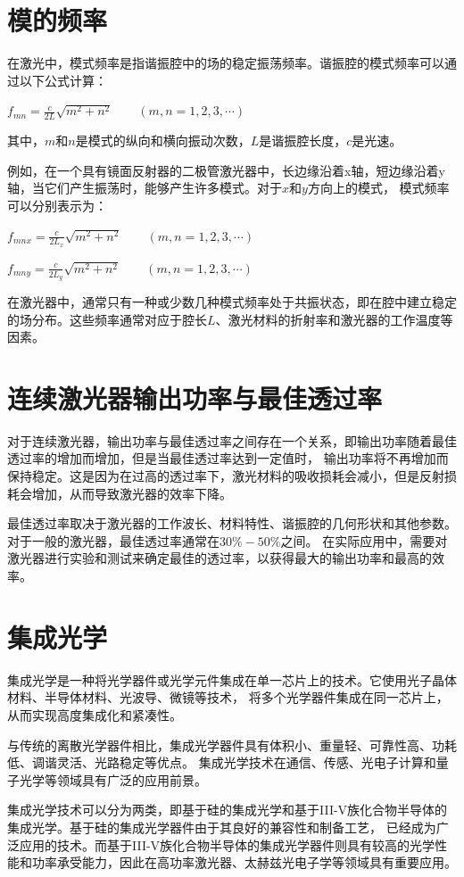 \documentclass[12pt, a4paper, oneside]{article}
\begin{document}
\begin{spacing}{2.0}
\section{模的频率}
在激光中，模式频率是指谐振腔中的场的稳定振荡频率。谐振腔的模式频率可以通过以下公式计算：

$f_{mn}=\frac{c}{2L}\sqrt{m^2+n^2}\qquad(m,n=1,2,3,\cdots)$

其中，$m$和$n$是模式的纵向和横向振动次数，$L$是谐振腔长度，$c$是光速。

例如，在一个具有镜面反射器的二极管激光器中，长边缘沿着x轴，短边缘沿着y轴，当它们产生振荡时，能够产生许多模式。对于$x$和$y$方向上的模式，
模式频率可以分别表示为：

$f_{mnx}=\frac{c}{2L_x}\sqrt{m^2+n^2}\qquad(m,n=1,2,3,\cdots)$

$f_{mny}=\frac{c}{2L_y}\sqrt{m^2+n^2}\qquad(m,n=1,2,3,\cdots)$

在激光器中，通常只有一种或少数几种模式频率处于共振状态，即在腔中建立稳定的场分布。这些频率通常对应于腔长$L$、激光材料的折射率和激光器的工作温度等因素。

\section{连续激光器输出功率与最佳透过率}

对于连续激光器，输出功率与最佳透过率之间存在一个关系，即输出功率随着最佳透过率的增加而增加，但是当最佳透过率达到一定值时，
输出功率将不再增加而保持稳定。这是因为在过高的透过率下，激光材料的吸收损耗会减小，但是反射损耗会增加，从而导致激光器的效率下降。

最佳透过率取决于激光器的工作波长、材料特性、谐振腔的几何形状和其他参数。对于一般的激光器，最佳透过率通常在$30\%-50\%$之间。
在实际应用中，需要对激光器进行实验和测试来确定最佳的透过率，以获得最大的输出功率和最高的效率。
\section{集成光学}
集成光学是一种将光学器件或光学元件集成在单一芯片上的技术。它使用光子晶体材料、半导体材料、光波导、微镜等技术，
将多个光学器件集成在同一芯片上，从而实现高度集成化和紧凑性。

与传统的离散光学器件相比，集成光学器件具有体积小、重量轻、可靠性高、功耗低、调谐灵活、光路稳定等优点。
集成光学技术在通信、传感、光电子计算和量子光学等领域具有广泛的应用前景。

集成光学技术可以分为两类，即基于硅的集成光学和基于III-V族化合物半导体的集成光学。基于硅的集成光学器件由于其良好的兼容性和制备工艺，
已经成为广泛应用的技术。而基于III-V族化合物半导体的集成光学器件则具有较高的光学性能和功率承受能力，因此在高功率激光器、太赫兹光电子学等领域具有重要应用。


\end{spacing}
\end{document}
